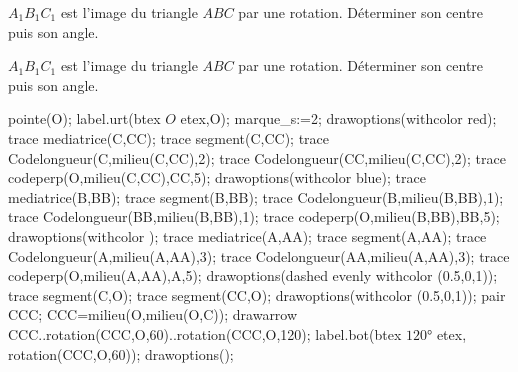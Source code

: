 \begin{exercice*}
    $A_1B_1C_1$ est l'image du triangle $ABC$ par une rotation. Déterminer son centre puis son angle.
    \hspace*{-10mm}
    \begin{Geometrie}[CoinHD={(9u,7u)}]        
        \enonceTroisiemeGTroisExoDouze
    \end{Geometrie}
\end{exercice*}
\begin{corrige}
    $A_1B_1C_1$ est l'image du triangle $ABC$ par une rotation. Déterminer son centre puis son angle.

    \begin{Geometrie}[CoinHD={(9u,7u)}]        
        \enonceTroisiemeGTroisExoDouze
        pointe(O);
        label.urt(btex $O$ etex,O);
        marque_s:=2;
        drawoptions(withcolor red);
        trace mediatrice(C,CC);
        trace segment(C,CC);
        trace Codelongueur(C,milieu(C,CC),2);
        trace Codelongueur(CC,milieu(C,CC),2);
        trace codeperp(O,milieu(C,CC),CC,5);
        drawoptions(withcolor blue);
        trace mediatrice(B,BB);
        trace segment(B,BB);
        trace Codelongueur(B,milieu(B,BB),1);
        trace Codelongueur(BB,milieu(B,BB),1);
        trace codeperp(O,milieu(B,BB),BB,5);
        drawoptions(withcolor \myMetapostGreen);
        trace mediatrice(A,AA);
        trace segment(A,AA);
        trace Codelongueur(A,milieu(A,AA),3);
        trace Codelongueur(AA,milieu(A,AA),3);
        trace codeperp(O,milieu(A,AA),A,5);
        drawoptions(dashed evenly withcolor (0.5,0,1));
        trace segment(C,O);
        trace segment(CC,O);
        drawoptions(withcolor (0.5,0,1));
        pair CCC;
        CCC=milieu(O,milieu(O,C));
        drawarrow CCC..rotation(CCC,O,60)..rotation(CCC,O,120);
        label.bot(btex $\ang{120}$ etex, rotation(CCC,O,60));
        drawoptions();   
    
    \end{Geometrie}
\end{corrige}

